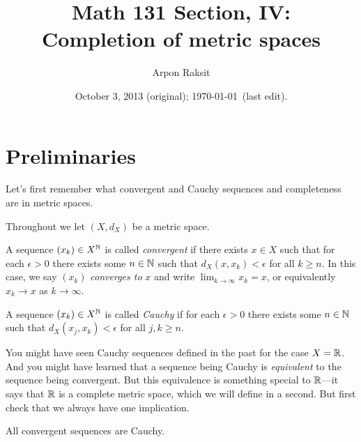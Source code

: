 


\title{Math 131 Section, IV:\\Completion of metric spaces}
\author{Arpon Raksit}
\date{October 3, 2013 (original); \today\ (last edit).}


\maketitle
\thispagestyle{fancy}



\section{Preliminaries}

Let's first remember what convergent and Cauchy sequences and
completeness are in metric spaces.

\begin{notation}
  Throughout we let $(X,d_X)$ be a metric space.
\end{notation}

\begin{definition}
  A sequence $(x_k) \in X^{\mathbb{N}}$ is called \textit{convergent} if there
  exists $x \in X$ such that for each $\epsilon > 0$ there exists some
  $n \in \mathbb{N}$ such that $d_X(x,x_k) < \epsilon$ for all $k \ge n$. In
  this case, we say $(x_k)$ \textit{converges to} $x$ and write
  $\lim_{k \to \infty} x_k = x$, or equivalently $x_k \to x$ as $k \to
  \infty$.
\end{definition}

\begin{definition}
  A sequence $(x_k) \in X^{\mathbb{N}}$ is called \textit{Cauchy} if for each
  $\epsilon > 0$ there exists some $n \in \mathbb{N}$ such that $d_X(x_j,x_k)
  < \epsilon$ for all $j,k \ge n$.
\end{definition}

You might have seen Cauchy sequences defined in the past for the case
$X = \mathbb{R}$. And you might have learned that a sequence being Cauchy is
\textit{equivalent} to the sequence being convergent. But this
equivalence is something special to $\mathbb{R}$---it says that $\mathbb{R}$ is a
complete metric space, which we will define in a second. But first
check that we always have one implication.

\begin{exercise}
  \label{convergentcauchy}
  All convergent sequences are Cauchy.
\end{exercise}


